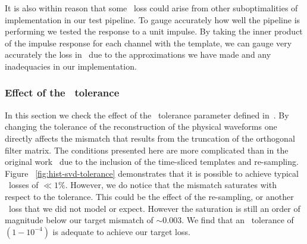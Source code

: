 It is also within reason that some \SNR\ loss could arise from other
suboptimalities of implementation in our test pipeline.  To gauge
accurately how well the pipeline is performing we tested the response to a
unit impulse.  By taking the inner product of the impulse response for each channel
with the template, we can gauge very accurately the loss in
\SNR\ due to the approximations we have made and any inadequacies in
our implementation.

\subsubsection{Effect of the \SVD\ tolerance}

In this section we check the effect of the \SVD\ tolerance parameter defined
in~\citep{Cannon:2010p10398}.  By changing the tolerance of the reconstruction
of the physical waveforms one directly affects the mismatch that results from
the truncation of the orthogonal filter matrix.  The conditions presented here
are more complicated than in the original work~\citep{Cannon:2010p10398} due to
the inclusion of the time-sliced templates and re-sampling.  Figure~%
\ref{fig:hist-svd-tolerance} demonstrates that it is possible to achieve
typical \SNR\ losses of $\ll1\%$.  However, we do notice that the mismatch
saturates with respect to the tolerance.  This could be the effect of the
re-sampling, or another \SNR\ loss that we did not model or expect.  However the
saturation is still an order of magnitude below our target mismatch of
$\sim$0.003.  We find that an \SVD\ tolerance of $\left(1-10^{-4}\right)$ is
adequate to achieve our target \SNR{} loss.
%
